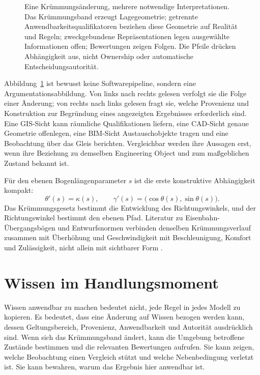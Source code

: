 \begin{figure}[H]
\centering

\caption{Eine Krümmungsänderung, mehrere notwendige Interpretationen. Das
Krümmungsband erzeugt Lagegeometrie; getrennte Anwendbarkeitsqualifikatoren
beziehen diese Geometrie auf Realität und Regeln; zweckgebundene
Repräsentationen legen ausgewählte Informationen offen; Bewertungen zeigen
Folgen. Die Pfeile drücken Abhängigkeit aus, nicht Ownership oder automatische
Entscheidungsautorität.}
\label{fig:curvature-consequence-chain}
\end{figure}

Abbildung~\ref{fig:curvature-consequence-chain} ist bewusst keine
Softwarepipeline, sondern eine Argumentationsabbildung. Von links nach rechts
gelesen verfolgt sie die Folge einer Änderung; von rechts nach links gelesen
fragt sie, welche Provenienz und Konstruktion zur Begründung eines angezeigten
Ergebnisses erforderlich sind. Eine GIS-Sicht kann räumliche Qualifikationen
liefern, eine CAD-Sicht genaue Geometrie offenlegen, eine BIM-Sicht
Austauschobjekte tragen und eine Beobachtung über das Gleis berichten.
Vergleichbar werden ihre Aussagen erst, wenn ihre Beziehung zu demselben
Engineering Object und zum maßgeblichen Zustand bekannt ist.

Für den ebenen Bogenlängenparameter \(s\) ist die erste konstruktive
Abhängigkeit kompakt:
\[
  \theta'(s)=\kappa(s),
  \qquad
  \gamma'(s)=\bigl(\cos\theta(s),\sin\theta(s)\bigr).
\]
Das Krümmungsgesetz bestimmt die Entwicklung des Richtungswinkels, und der
Richtungswinkel bestimmt den ebenen Pfad. Literatur zu
Eisenbahn-Übergangsbögen und Entwurfsnormen verbinden denselben
Krümmungsverlauf zusammen mit Überhöhung und Geschwindigkeit mit
Beschleunigung, Komfort und Zulässigkeit, nicht allein mit sichtbarer Form
\cite{Kufver1997MathematicalDescription,Kufver2000RailwayAlignment,EN13803_2017,BrustadDalmo2020Review}.

\section{Wissen im Handlungsmoment}

Wissen anwendbar zu machen bedeutet nicht, jede Regel in jedes Modell zu
kopieren. Es bedeutet, dass eine Änderung auf Wissen bezogen werden kann,
dessen Geltungsbereich, Provenienz, Anwendbarkeit und Autorität ausdrücklich
sind. Wenn sich das Krümmungsband ändert, kann die Umgebung betroffene Zustände
bestimmen und die relevanten Bewertungen aufrufen. Sie kann zeigen, welche
Beobachtung einen Vergleich stützt und welche Nebenbedingung verletzt ist. Sie
kann bewahren, warum das Ergebnis hier anwendbar ist.

